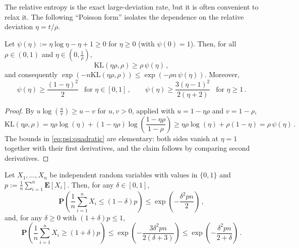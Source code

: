 \documentclass{article}
\newcommand{\lab}{\left[} %
\newcommand{\rab}{\right]} %
\newcommand{\ab}[1]{\lab #1 \rab} %
\newcommand{\abOf}[1]{\!\ab{#1}} %
\newcommand{\lb}{\left(} %
\newcommand{\rb}{\right)} %
\newcommand{\br}[1]{\lb #1 \rb} %
\newcommand{\brOf}[1]{\!\br{#1}} %
\renewcommand{\Pr}{\mathbf{P}} %
\newcommand{\PrOf}[1]{\Pr\brOf{#1}}
\newcommand{\E}{\mathbf{E}} %
\newcommand{\EOf}[1]{\E\abOf{#1}}
\newcommand{\eqcm}{\,,} %
\newcommand{\eqfs}{\,.}
\newcommand{\kullback}{\mathrm{K\!L}} %
\begin{document}
%
The relative entropy is the exact large-deviation rate, but it is often
convenient to relax it. The following ``Poisson form'' isolates the dependence
on the relative deviation $\eta = t/\rho$.
%
\begin{corollary}\label{cor:chernoff:poisson}
    Let $\psi(\eta) := \eta \log \eta - \eta + 1 \geq 0$ for $\eta \geq 0$
    (with $\psi(0) = 1$). Then, for all $\rho \in (0,1)$ and
    $\eta \in \br{0, \frac1\rho}$,
    \begin{equation}\label{eq:kl:poisson}
        \kullback(\eta\rho, \rho) \geq \rho\, \psi(\eta)
        \eqcm
    \end{equation}
    and consequently
    $\exp\brOf{-n \kullback(\eta\rho,\rho)} \leq \exp\brOf{-\rho n\, \psi(\eta)}$.
    Moreover,
    \begin{equation}\label{eq:psi:quadratic}
        \psi(\eta) \geq \frac{(1-\eta)^2}{2} \ \ \text{ for $\eta \in [0,1]$}
        \eqcm
        \qquad
        \psi(\eta) \geq \frac{3(\eta-1)^2}{2(\eta+2)} \ \ \text{ for $\eta \geq 1$}
        \eqfs
    \end{equation}
\end{corollary}
%
\begin{proof}
    By $u \log\brOf{\frac uv} \geq u - v$ for $u, v > 0$, applied with
    $u = 1 - \eta\rho$ and $v = 1 - \rho$,
    \begin{equation}
        \kullback(\eta\rho,\rho)
        =
        \eta\rho \log(\eta) + (1-\eta\rho) \log\brOf{\frac{1-\eta\rho}{1-\rho}}
        \geq
        \eta\rho \log(\eta) + \rho \br{1 - \eta}
        =
        \rho\, \psi(\eta)
        \eqfs
    \end{equation}
    The bounds in \eqref{eq:psi:quadratic} are elementary: both sides vanish at
    $\eta = 1$ together with their first derivatives, and the claim follows by
    comparing second derivatives.
\end{proof}
%
\begin{proposition}\label{prp:chernoff:multi}
    Let $X_1, \dots, X_n$ be independent random variables with values in
    $\{0, 1\}$ and $p := \frac1n \sum_{i=1}^n \EOf{X_i}$.
    Then, for any $\delta \in [0,1]$,
    \begin{equation}
        \PrOf{\frac1n \sum_{i=1}^n X_i \leq (1 - \delta)p}
        \leq
        \exp\brOf{-\frac{\delta^2 p n}{2}}
        \eqcm
    \end{equation}
    and, for any $\delta \geq 0$ with $(1+\delta)p \leq 1$,
    \begin{equation}
        \PrOf{\frac1n \sum_{i=1}^n X_i \geq (1 + \delta)p}
        \leq
        \exp\brOf{-\frac{3 \delta^2 p n}{2(\delta+3)}}
        \leq
        \exp\brOf{-\frac{\delta^2 p n}{2 + \delta}}
        \eqfs
    \end{equation}
\end{proposition}
\end{document}
